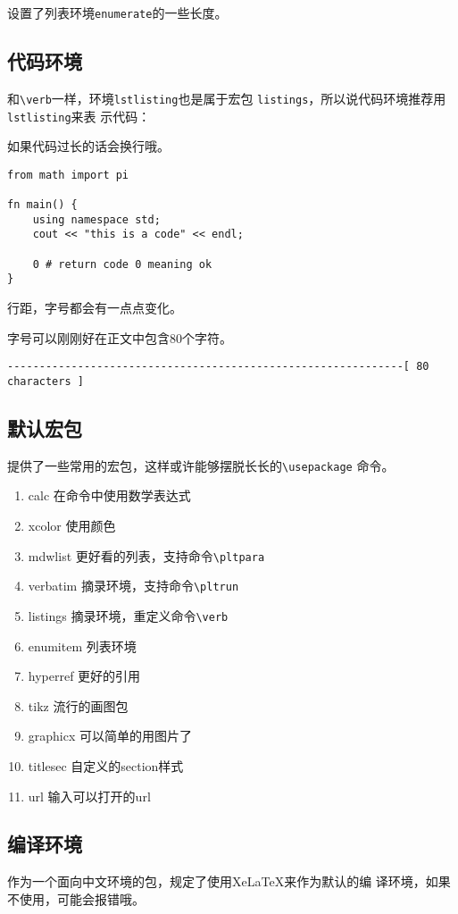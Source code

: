 \documentclass{../src/peterlitsdoc}
\newcommand{\vb}{\verb}
\begin{document}
设置了列表环境\vb|enumerate|的一些长度。


\subsection{代码环境}

和\verb|\verb|一样，环境\vb|lstlisting|也是属于宏包
\vb|listings|，所以说代码环境推荐用\vb|lstlisting|来表
示代码：

\begin{pltrun}
如果代码过长的话会换行哦。
\begin{lstlisting}
from math import pi

fn main() {
    using namespace std;
    cout << "this is a code" << endl;

    0 # return code 0 meaning ok
}
\end{lstlisting}

行距，字号都会有一点点变化。
\end{pltrun}

字号可以刚刚好在正文中包含80个字符。
\begin{lstlisting}
--------------------------------------------------------------[ 80 characters ]
\end{lstlisting}


\subsection{默认宏包}

提供了一些常用的宏包，这样或许能够摆脱长长的\vb|\usepackage|
命令。

\begin{enumerate}
    \item calc          \hfill 在命令中使用数学表达式
    \item xcolor        \hfill 使用颜色
    \item mdwlist
          \hfill 更好看的列表，支持命令\vb|\pltpara|
    \item verbatim      \hfill 摘录环境，支持命令\vb|\pltrun|
    \item listings      \hfill 摘录环境，重定义命令\verb|\verb|
    \item enumitem      \hfill 列表环境
    \item hyperref      \hfill 更好的引用
    \item tikz          \hfill 流行的画图包
    \item graphicx      \hfill 可以简单的用图片了
    \item titlesec      \hfill 自定义的section样式
    \item url           \hfill 输入可以打开的url
\end{enumerate}


\subsection{编译环境}

作为一个面向中文环境的包，规定了使用XeLaTeX来作为默认的编
译环境，如果不使用，可能会报错哦。


\end{document}
